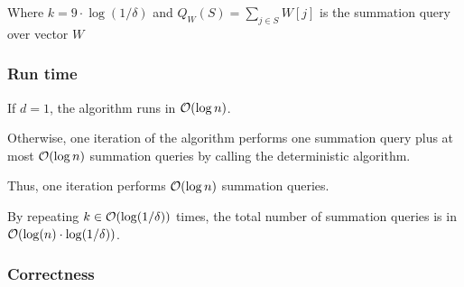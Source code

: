 Where $k = 9 \cdot \log(1/\delta)$ and $Q_W(S) = \sum_{j \in S} W[j]$ is the summation query over vector $W$

\subsubsection*{Run time}

If $d = 1$, the algorithm runs in $\mathcal{O}(\log n)$.

Otherwise, one iteration of the algorithm performs one summation query plus at most $\mathcal{O}(\log n)$ summation queries by calling the deterministic algorithm.

Thus, one iteration performs $\mathcal{O}(\log n)$ summation queries.

By repeating $k \in \mathcal{O}(\log(1/\delta))$ times, the total number of summation queries is in  $\mathcal{O}(\log(n)\cdot\log(1/\delta))$.

\subsubsection*{Correctness}

